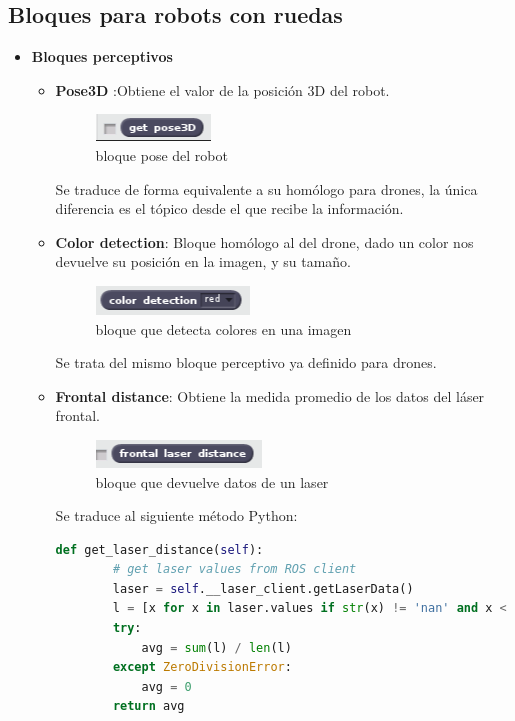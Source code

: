 \subsection{Bloques para robots con ruedas}
\begin{itemize}
\item \textbf{Bloques perceptivos}
	\begin{itemize}
	\item \textbf{Pose3D} :Obtiene el valor de la posición 3D del robot.
		\begin{figure}[H]
     		\centering
     		\includegraphics[scale=1.2]{img/block-pose.png}
     		\caption{bloque pose del robot}
  		\label{fig:listas}
  	\end{figure}
Se traduce de forma equivalente a su homólogo para drones, la única diferencia es el tópico desde el que recibe la información.\\
 
	\item \textbf{Color detection}: Bloque homólogo al del drone, dado un color nos devuelve su posición en la imagen, y su tamaño.
		\begin{figure}[H]
     		\centering
     		\includegraphics[scale=1.2]{img/block-color.png}
     		\caption{bloque que detecta colores en una imagen}
  		\label{fig:listas}
  	\end{figure}
Se trata del mismo bloque perceptivo ya definido para drones.\\

\item \textbf{Frontal distance}: Obtiene la medida promedio de los datos del láser frontal. 
		\begin{figure}[H]
     		\centering
     		\includegraphics[scale=1.2]{img/block-laser.png}
     		\caption{bloque que devuelve datos de un laser}
  		\label{fig:listas}
  	\end{figure}
Se traduce al siguiente método Python:\\

\begin{lstlisting}[language=python,firstnumber=1]
def get_laser_distance(self):
        # get laser values from ROS client
        laser = self.__laser_client.getLaserData()
        l = [x for x in laser.values if str(x) != 'nan' and x < 10]
        try:
            avg = sum(l) / len(l)
        except ZeroDivisionError:
            avg = 0
        return avg
\end{lstlisting}


\end{itemize}
\end{itemize}
